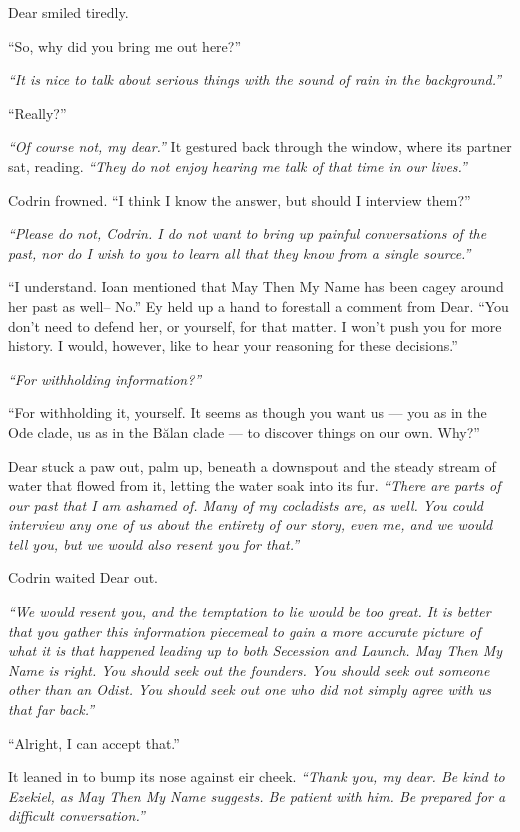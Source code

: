 Dear smiled tiredly.

``So, why did you bring me out here?''

\emph{``It is nice to talk about serious things with the sound of rain in the background.''}

``Really?''

\emph{``Of course not, my dear.''} It gestured back through the window, where its partner sat, reading. \emph{``They do not enjoy hearing me talk of that time in our lives.''}

Codrin frowned. ``I think I know the answer, but should I interview them?''

\emph{``Please do not, Codrin. I do not want to bring up painful conversations of the past, nor do I wish to you to learn all that they know from a single source.''}

``I understand. Ioan mentioned that May Then My Name has been cagey around her past as well-- No.'' Ey held up a hand to forestall a comment from Dear. ``You don't need to defend her, or yourself, for that matter. I won't push you for more history. I would, however, like to hear your reasoning for these decisions.''

\emph{``For withholding information?''}

``For withholding it, yourself. It seems as though you want us — you as in the Ode clade, us as in the Bălan clade — to discover things on our own. Why?''

Dear stuck a paw out, palm up, beneath a downspout and the steady stream of water that flowed from it, letting the water soak into its fur. \emph{``There are parts of our past that I am ashamed of. Many of my cocladists are, as well. You could interview any one of us about the entirety of our story, even me, and we would tell you, but we would also resent you for that.''}

Codrin waited Dear out.

\emph{``We would resent you, and the temptation to lie would be too great. It is better that you gather this information piecemeal to gain a more accurate picture of what it is that happened leading up to both Secession and Launch. May Then My Name is right. You should seek out the founders. You should seek out someone other than an Odist. You should seek out one who did not simply agree with us that far back.''}

``Alright, I can accept that.''

It leaned in to bump its nose against eir cheek. \emph{``Thank you, my dear. Be kind to Ezekiel, as May Then My Name suggests. Be patient with him. Be prepared for a difficult conversation.''}

